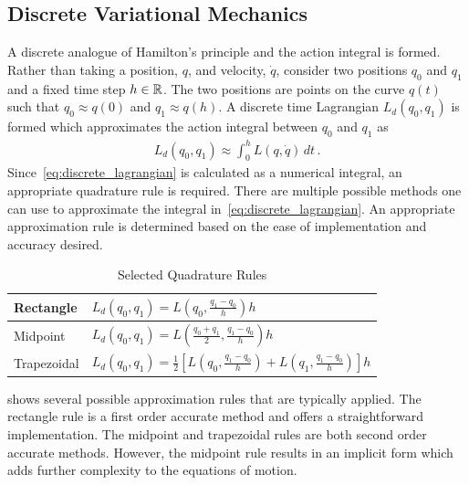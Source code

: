 \documentclass[preprint]{elsarticle}
\begin{document}
\subsection{Discrete Variational Mechanics}
A discrete analogue of Hamilton's principle and the action integral is formed.
Rather than taking a position, \( q \), and velocity, \( \dot{q} \), consider two positions \( q_0 \) and \( q_1 \) and a fixed time step \( h \in \mathbb{R} \).
The two positions are points on the curve \( q(t) \) such that \( q_0 \approx q(0) \) and \( q_1 \approx q(h) \).
A discrete time Lagrangian \( L_d( q_0, q_1) \) is formed which approximates the action integral between \( q_0 \) and \( q_1 \) as 
\begin{align}\label{eq:discrete_lagrangian}
	L_d\left( q_0 , q_1 \right) \approx \int_{0}^{h} L \left( q , \dot{q} \right) \, dt \, .
\end{align}
Since~\cref{eq:discrete_lagrangian} is calculated as a numerical integral, an appropriate quadrature rule is required.
There are multiple possible methods one can use to approximate the integral in~\cref{eq:discrete_lagrangian}.
An appropriate approximation rule is determined based on the ease of implementation and accuracy desired.
\begin{table}[htbp]
\caption{Selected Quadrature Rules\label{tab:quadrature}}
\begin{center}
\begin{tabular}{l|l}Rectangle & \( L_d(q_0,q_1) =L(q_0,\frac{q_1-q_0}{h}) h \)  \\ \hline
Midpoint & \( L_d(q_0,q_1) = L(\frac{q_0 + q_1}{2},\frac{q_1 - q_0}{h}) h \) \\ \hline
Trapezoidal & \( L_d(q_0, q_1) = \frac{1}{2} \left[ L(q_0, \frac{q_1 - q_0}{h} ) + L(q_1, \frac{q_1 - q_0 }{h} )\right] h \)
\end{tabular} 
\end{center}
\end{table}
 shows several possible approximation rules that are typically applied.
The rectangle rule is a first order accurate method and offers a straightforward implementation.
The midpoint and trapezoidal rules are both second order accurate methods. 
However, the midpoint rule results in an implicit form which adds further complexity to the equations of motion.
\end{document}
